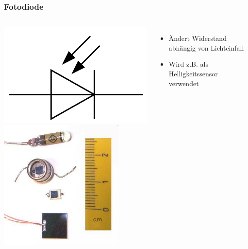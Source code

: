 \begin{frame}
    \frametitle{Fotodiode}
    \begin{columns}[c]
        \column[c]{5cm}
        \begin{center}
            \includegraphics[width=1\textwidth]{e12/Symbol_Photodiode.png}\\
            \includegraphics[width=0.8\textwidth]{e12/Fotodio.jpg}
            \tiny \hyperlink{refs}{\cite{wm}}
        \end{center}
        \column{5cm}
    \begin{itemize}
			\item Ändert Widerstand abhängig von Lichteinfall 
			\item Wird z.B. als Helligkeitssensor verwendet
    \end{itemize}
    \end{columns}
\end{frame}

